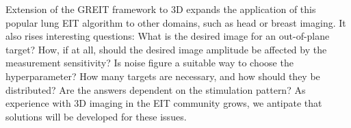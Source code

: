 \documentclass[10pt,a4paper]{article}
\renewenvironment{thebibliography}[1]{%
    \begin{oldthebibliography}{#1}%
      \setlength{\parskip}{0ex}%
      \setlength{\itemsep}{0ex}%
  }%
  {%
    \end{oldthebibliography}%
  }
\begin{document}
\begin{multicols}{2}
Extension of the GREIT framework to 3D expands the application of this popular 
lung EIT algorithm to other domains, such as head or breast imaging. It also  
rises interesting questions: What is 
the desired image for an out-of-plane target? How, if 
at all, should the desired image amplitude be affected by the measurement 
sensitivity? Is noise figure a suitable way to choose the hyperparameter? How 
many targets are necessary, and how should they be distributed? Are the answers 
dependent on the stimulation pattern?
As experience with 3D imaging in the EIT community grows,
we antipate that solutions will be developed for these issues.

\footnotesize


\end{multicols}
\end{document}
